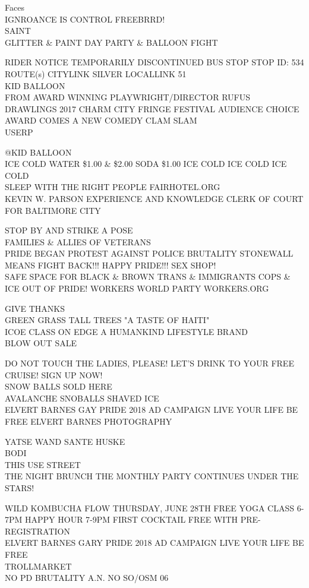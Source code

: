\documentclass[10pt,letterpaper]{article}
\begin{document}
Faces\\
IGNROANCE IS CONTROL FREEBRRD!\\
SAINT\\
GLITTER \& PAINT DAY PARTY \& BALLOON FIGHT

RIDER NOTICE TEMPORARILY DISCONTINUED BUS STOP STOP ID: 534 ROUTE(s) CITYLINK SILVER LOCALLINK 51\\
KID BALLOON\\
FROM AWARD WINNING PLAYWRIGHT/DIRECTOR RUFUS DRAWLINGS 2017 CHARM CITY FRINGE FESTIVAL AUDIENCE CHOICE AWARD COMES A NEW COMEDY CLAM SLAM\\
USERP

@KID BALLOON\\
ICE COLD WATER \$1.00 \& \$2.00 SODA \$1.00 ICE COLD ICE COLD ICE COLD\\
SLEEP WITH THE RIGHT PEOPLE FAIRHOTEL.ORG\\
KEVIN W. PARSON EXPERIENCE AND KNOWLEDGE CLERK OF COURT FOR BALTIMORE CITY

STOP BY AND STRIKE A POSE\\
FAMILIES \& ALLIES OF VETERANS\\
PRIDE BEGAN PROTEST AGAINST POLICE BRUTALITY STONEWALL MEANS FIGHT BACK!!! HAPPY PRIDE!!! SEX SHOP!\\
SAFE SPACE FOR BLACK \& BROWN TRANS \& IMMIGRANTS COPS \& ICE OUT OF PRIDE!  WORKERS WORLD PARTY WORKERS.ORG

GIVE THANKS\\
GREEN GRASS TALL TREES "A TASTE OF HAITI"\\
ICOE CLASS ON EDGE A HUMANKIND LIFESTYLE BRAND\\
BLOW OUT SALE

DO NOT TOUCH THE LADIES, PLEASE!  LET'S DRINK TO YOUR FREE CRUISE!  SIGN UP NOW!\\
SNOW BALLS SOLD HERE\\
AVALANCHE SNOBALLS SHAVED ICE\\
ELVERT BARNES GAY PRIDE 2018 AD CAMPAIGN LIVE YOUR LIFE BE FREE ELVERT BARNES PHOTOGRAPHY

YATSE WAND SANTE HUSKE\\
BODI\\
THIS USE STREET\\
THE NIGHT BRUNCH THE MONTHLY PARTY CONTINUES UNDER THE STARS!

WILD KOMBUCHA FLOW THURSDAY, JUNE 28TH FREE YOGA CLASS 6{-}7PM HAPPY HOUR 7{-}9PM FIRST COCKTAIL FREE WITH PRE{-}REGISTRATION\\
ELVERT BARNES GARY PRIDE 2018 AD CAMPAIGN LIVE YOUR LIFE BE FREE\\
TROLLMARKET\\
NO PD BRUTALITY A.N. NO SO/OSM 06
\end{document}
